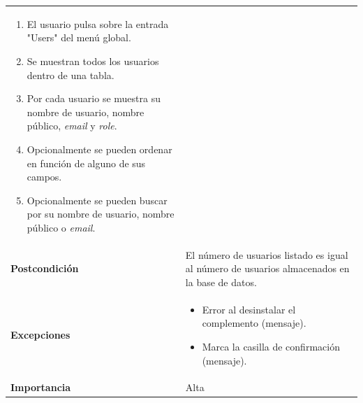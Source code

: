\documentclass[
]{article}
\providecommand{\tightlist}{%
  \setlength{\itemsep}{0pt}\setlength{\parskip}{0pt}}
\begin{document}
\begin{longtable}[]{@{}ll@{}}
\begin{minipage}[t]{0.74\columnwidth}
\begin{enumerate}
\def\labelenumi{\arabic{enumi}.}
\tightlist
\item
  El usuario pulsa sobre la entrada "Users" del menú global.
\item
  Se muestran todos los usuarios dentro de una tabla.
\item
  Por cada usuario se muestra su nombre de usuario, nombre público,
  \emph{email} y \emph{role}.
\item
  Opcionalmente se pueden ordenar en función de alguno de sus campos.
\item
  Opcionalmente se pueden buscar por su nombre de usuario, nombre
  público o \emph{email}.
\end{enumerate}\strut
\end{minipage}\tabularnewline
\begin{minipage}[t]{0.20\columnwidth}\raggedright
\textbf{Postcondición}\strut
\end{minipage} & \begin{minipage}[t]{0.74\columnwidth}\raggedright
El número de usuarios listado es igual al número de usuarios almacenados
en la base de datos.\strut
\end{minipage}\tabularnewline
\begin{minipage}[t]{0.20\columnwidth}\raggedright
\textbf{Excepciones}\strut
\end{minipage} & \begin{minipage}[t]{0.74\columnwidth}\raggedright
\begin{itemize}
\tightlist
\item
  Error al desinstalar el complemento (mensaje).
\item
  Marca la casilla de confirmación (mensaje).
\end{itemize}\strut
\end{minipage}\tabularnewline
\begin{minipage}[t]{0.20\columnwidth}\raggedright
\textbf{Importancia}\strut
\end{minipage} & \begin{minipage}[t]{0.74\columnwidth}\raggedright
Alta\strut
\end{minipage}\tabularnewline
\bottomrule
\end{longtable}
\end{document}
